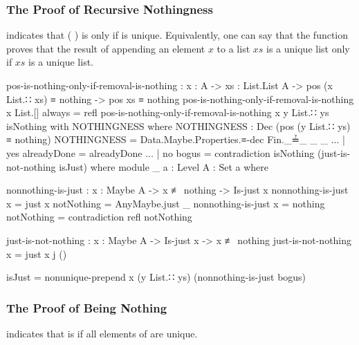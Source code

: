 \documentclass{report}
\begin{document}
\subsubsection{The Proof of Recursive Nothingness}
 indicates that  \AgdaSymbol(  \AgdaSymbol) is  only if  is unique.  Equivalently, one can say that the function proves that the result of appending an element \(x\) to a list \(xs\) is a unique list only if \(xs\) is a unique list.

\begin{code}
    pos-is-nothing-only-if-removal-is-nothing :
      {x : A} ->
      {xs : List.List A} ->
      pos (x List.∷ xs) ≡ nothing ->
      pos xs ≡ nothing
    pos-is-nothing-only-if-removal-is-nothing {x} {List.[]} always = refl
    pos-is-nothing-only-if-removal-is-nothing {x} {y List.∷ ys} isNothing with NOTHINGNESS
      where
      NOTHINGNESS : Dec (pos (y List.∷ ys) ≡ nothing)
      NOTHINGNESS = Data.Maybe.Properties.≡-dec Fin._≟_ _ _
    ... | yes alreadyDone = alreadyDone
    ... | no bogus = contradiction isNothing (just-is-not-nothing isJust)
      where
      module _
        {a : Level}
        {A : Set a} where

        nonnothing-is-just : {x : Maybe A} -> x ≢ nothing -> Is-just x
        nonnothing-is-just {x = just x} notNothing = AnyMaybe.just _
        nonnothing-is-just {x = nothing} notNothing = contradiction refl notNothing

        just-is-not-nothing : {x : Maybe A} -> Is-just x -> x ≢ nothing
        just-is-not-nothing {x = just x} j ()

      isJust = nonunique-prepend x (y List.∷ ys) (nonnothing-is-just bogus)
\end{code}

\subsubsection{The Proof of Being Nothing}
 indicates that   is  if all elements of  are unique.
\end{document}
